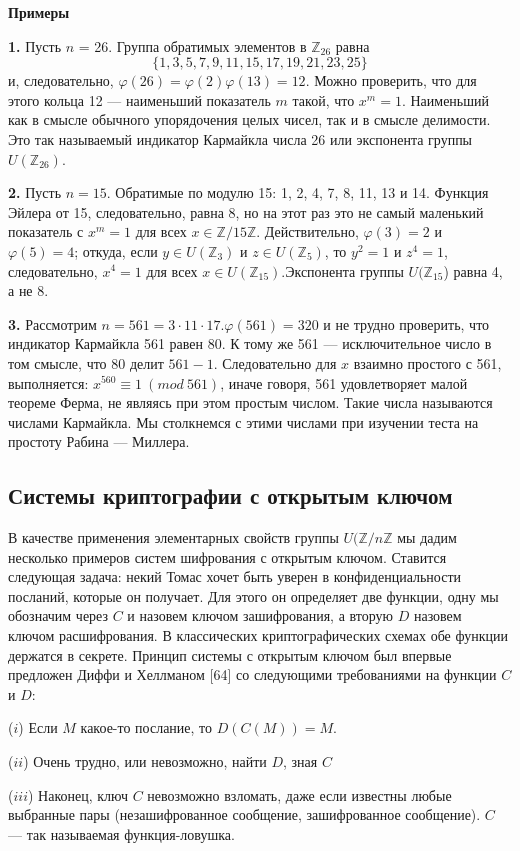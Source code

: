 \documentclass{mai_book}
\begin{document}
\textbf{Примеры} \par
 \textbf{1.} Пусть $n$ = 26. Группа обратимых элементов в $\mathbb{Z}_{26}$ равна
$$\{1,3,5,7,9,11,15,17,19,21,23,25\}$$
и, следовательно, $\varphi (26) = \varphi (2) \varphi (13) = 12$. Можно проверить, что для этого кольца 12 --- наименьший показатель $m$ такой, что $x^{m} = 1$. Наименьший как в смысле обычного упорядочения целых чисел, так и в
смысле делимости. Это так называемый индикатор Кармайкла числа 26 или экспонента группы $U(\mathbb{Z}_{26})$. \par
  \textbf{2.} Пусть $n = 15$. Обратимые по модулю 15: 1, 2, 4, 7, 8, 11, 13
и 14. Функция Эйлера от 15, следовательно, равна 8, но на этот раз
это не самый маленький показатель с $x^{m} = 1$ для всех $x \in \mathbb{Z}/15\mathbb{Z}$. Действительно, $\varphi(3) = 2$ и $\varphi(5) = 4$; откуда, если $y \in U(\mathbb{Z}_{3})$ и $z \in U(\mathbb{Z}_5)$, то $y^{2} = 1$ и $z^4 = 1$, следовательно, $x^4 = 1$ для всех $x \in U(\mathbb{Z}_{15})$.Экспонента группы $U(\mathbb{Z}_{15}$) равна 4, а не 8. \par
  \textbf{3.} Рассмотрим $n = 561 = 3 \cdot 11 \cdot 17$.$\varphi (561) = 320$ и не трудно проверить, что индикатор Кармайкла 561 равен 80. К тому же 561 --- исключительное число в том смысле, что 80 делит $561 - 1$. Следовательно
для $x$ взаимно простого с 561, выполняется: $x^{560} \equiv 1\ (mod\ 561)$, 
иначе говоря, 561 удовлетворяет малой теореме Ферма, не являясь при этом простым числом. Такие числа называются числами Кармайкла. Мы столкнемся с этими числами при изучении теста на простоту Рабина — Миллера. \\
\subsection{Системы криптографии с открытым ключом}
В качестве применения элементарных свойств группы $U(\mathbb{Z}/n\mathbb{Z}$ мы дадим несколько примеров систем шифрования с открытым ключом. 
Ставится следующая задача: некий Томас хочет быть уверен в 
конфиденциальности посланий, которые он получает. Для этого он определяет
две функции, одну мы обозначим через $C$ и назовем ключом 
зашифрования, а вторую $D$ назовем ключом расшифрования. В классических
криптографических схемах обе функции держатся в секрете. Принцип
системы с открытым ключом был впервые предложен Диффи и Хеллманом [64] со следующими требованиями на функции $C$ и $D$:\par
  ($i$) Если $M$ какое-то послание, то $D(C(M)) = M$.\par
  ($ii$) Очень трудно, или невозможно, найти $D$, зная $C$\par
  ($iii$) Наконец, ключ $C$ невозможно взломать, даже если известны
любые выбранные пары (незашифрованное сообщение, зашифрованное
сообщение). $C$ --- так называемая функция-ловушка.
\pagebreak
\newpage
\end{document}
